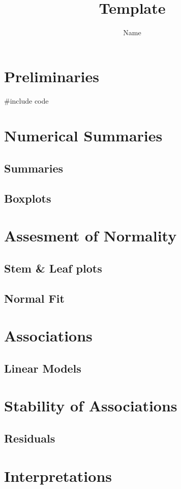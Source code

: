 \documentclass[11pt]{article}
\title{Template}
\author{Name}
\begin{document}
\maketitle
\section{Preliminaries}
#include code

\section{Numerical Summaries}
\subsection{Summaries}
\subsection{Boxplots}

\section{Assesment of Normality}
\subsection{Stem & Leaf plots}
\subsection{Normal Fit}

\section{Associations}
\subsection{Linear Models}

\section{Stability of Associations}
\subsection{Residuals}

\section{Interpretations}
\end{document}
